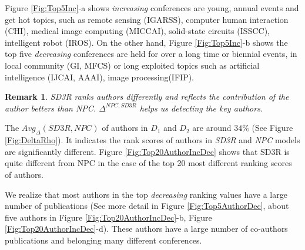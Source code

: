 \documentclass[10pt,leqno,twoside]{article}
\newtheorem{remark}{\indent Remark}[section]
\begin{document}
Figure \ref{Fig:Top5Inc}-a shows   \textit{increasing} conferences are young, annual events and get hot topics, such as remote sensing (IGARSS), computer human interaction (CHI), medical image computing (MICCAI), solid-state circuits (ISSCC), intelligent robot (IROS). On the other hand, Figure \ref{Fig:Top5Inc}-b shows the top five \textit{decreasing} conferences are held for over a long time or biennial events, in local community (GI, MFCS) or long exploited topics such as artificial intelligence (IJCAI, AAAI), image processing(IFIP).
\begin{remark}
SD3R ranks authors differently and reflects the contribution of the author betters than NPC.
$\Delta^{NPC,SD3R}$ helps us  detecting the key authors.
\end{remark}
The $Avg_{\Delta}(SD3R,NPC)$ of authors in $D_1$ and $D_2$ are around $34\%$ (See Figure \ref{Fig:DeltaRho}). It indicates the rank scores of authors in \textit{SD3R} and \textit{NPC} models are significantly different. Figure \ref{Fig:Top20AuthorIncDec} shows that SD3R is quite different from NPC in the case of the top 20 most different ranking scores of authors.

We realize that most authors in the top \textit{decreasing} ranking values have a large number of publications (See more detail in Figure \ref{Fig:Top5AuthorDec}, about five authors in Figure \ref{Fig:Top20AuthorIncDec}-b, Figure \ref{Fig:Top20AuthorIncDec}-d). These authors have a large number of co-authors publications and belonging many different conferences.  
\end{document}

